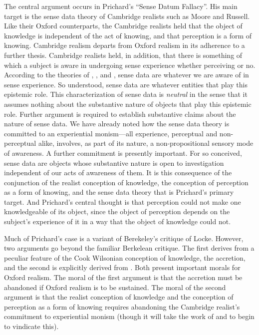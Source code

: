 \documentclass[11pt]{article}
\begin{document}
The central argument occurs in Prichard's \citeyearpar{Prichard:1938ve} ``Sense Datum Fallacy''. His main target is the sense data theory of Cambridge realists such as Moore and Russell. Like their Oxford counterparts, the Cambridge realists held that the object of knowledge is independent of the act of knowing, and that perception is a form of knowing. Cambridge realism departs from Oxford realism in its adherence to a further thesis. Cambridge realists held, in addition, that there is something of which a subject is aware in undergoing sense experience whether perceiving or no. According to the theories of \citet{Moore:1953nx}, \citet{Russell:1912uq}, and \citet{Price:1932fk}, sense data are whatever we are aware of in sense experience. So understood, sense data are whatever entities that play this epistemic role. This characterization of sense data is \emph{neutral} in the sense that it assumes nothing about the substantive nature of objects that play this epistemic role. Further argument is required to establish substantive claims about the nature of sense data. We have already noted how the sense data theory is committed to an experiential monism---all experience, perceptual and non-perceptual alike, involves, as part of its nature, a non-propositional sensory mode of awareness. A further commitment is presently important. For so conceived, sense data are objects whose substantive nature is open to investigation independent of our acts of awareness of them. It is this consequence of the conjunction of the realist conception of knowledge, the conception of perception as a form of knowing, and the sense data theory that is Prichard's primary target. And Prichard's central thought is that perception could not make one knowledgeable of its object, since the object of perception depends on the subject's experience of it in a way that the object of knowledge could not.

Much of Prichard's case is a variant of Berekeley's critique of Locke. However, two arguments go beyond the familiar Berkelean critique. The first derives from a peculiar feature of the Cook Wilsonian conception of knowledge, the accretion, and the second is explicitly derived from \citet{Paul:1936kd}. Both present important morals for Oxford realism. The moral of the first argument is that the accretion must be abandoned if Oxford realism is to be sustained. The moral of the second argument is that the realist conception of knowledge and the conception of perception as a form of knowing requires abandoning the Cambridge realist's commitment to experiential monism (though it will take the work of \citet{Austin:1962lr} and \citet{Hinton:1973js} to begin to vindicate this).
\end{document}
